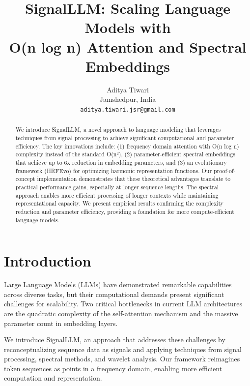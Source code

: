 \documentclass[10pt,twocolumn,letterpaper]{article}
\begin{document}
\title{SignalLLM: Scaling Language Models with \\ O(n log n) Attention and Spectral Embeddings}

\author{Aditya Tiwari\\
Jamshedpur, India\\
{\tt\small aditya.tiwari.jsr@gmail.com}
}

\maketitle

\begin{abstract}
   We introduce SignalLLM, a novel approach to language modeling that leverages techniques from signal processing to achieve significant computational and parameter efficiency. The key innovations include: (1) frequency domain attention with O(n log n) complexity instead of the standard O(n²), (2) parameter-efficient spectral embeddings that achieve up to 6x reduction in embedding parameters, and (3) an evolutionary framework (HRFEvo) for optimizing harmonic representation functions. Our proof-of-concept implementation demonstrates that these theoretical advantages translate to practical performance gains, especially at longer sequence lengths. The spectral approach enables more efficient processing of longer contexts while maintaining representational capacity. We present empirical results confirming the complexity reduction and parameter efficiency, providing a foundation for more compute-efficient language models.
\end{abstract}

\section{Introduction}

Large Language Models (LLMs) have demonstrated remarkable capabilities across diverse tasks, but their computational demands present significant challenges for scalability. Two critical bottlenecks in current LLM architectures are the quadratic complexity of the self-attention mechanism and the massive parameter count in embedding layers.

We introduce SignalLLM, an approach that addresses these challenges by reconceptualizing sequence data as signals and applying techniques from signal processing, spectral methods, and wavelet analysis. Our framework reimagines token sequences as points in a frequency domain, enabling more efficient computation and representation.
\end{document}
